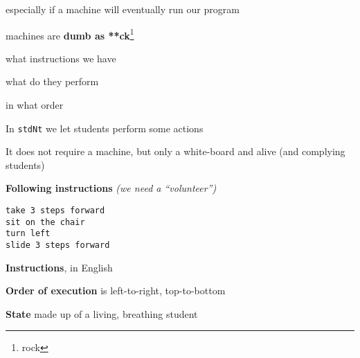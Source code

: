 \documentclass{beamer}
\begin{document}
\begin{slide}{
\item especially if a machine will eventually run our program
\item machines are \textbf{dumb as **ck}\footnote{rock}
}\end{slide}

\begin{slide}{
\item what instructions we have
\item what do they perform
\item in what order
}\end{slide}

\begin{slide}{
\item In \texttt{stdNt} we let students perform some actions
\item It does not require a machine, but only a white-board and alive (and complying students)
}\end{slide}

\begin{frame}[fragile]
\textbf{Following instructions} \textit{(we need a ``volunteer'')}

\begin{lstlisting}[frame=shadowbox]
take 3 steps forward
sit on the chair
turn left
slide 3 steps forward
\end{lstlisting}
\end{frame}

\begin{slide}{
\item \textbf{Instructions}, in English
\item \textbf{Order of execution} is left-to-right, top-to-bottom
\item \textbf{State} made up of a living, breathing student
}\end{slide}

\end{document}
